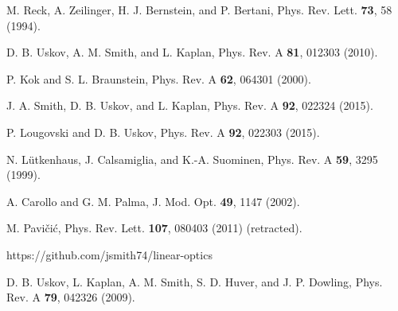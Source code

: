 \documentclass[aps,pra,twocolumn,superscriptaddress,floatfix,10pt]{revtex4}
\begin{document}
\begin{thebibliography}{99}
 M. Reck, A. Zeilinger, H. J. Bernstein, and P. Bertani, Phys. Rev. Lett. {\bf 73}, 58 (1994).

 D. B. Uskov, A. M. Smith, and L. Kaplan,
Phys. Rev. A {\bf 81}, 012303 (2010).

 P. Kok and S. L. Braunstein, Phys. Rev. A {\bf 62}, 064301 (2000).

 J. A. Smith, D. B. Uskov, and L. Kaplan, Phys. Rev. A {\bf 92}, 022324 (2015).

 P. Lougovski and D. B. Uskov, Phys. Rev. A {\bf 92}, 022303 (2015).

 N. L\"utkenhaus, J. Calsamiglia, and K.-A. Suominen, Phys. Rev. A {\bf 59}, 3295 (1999).

 A. Carollo and G. M. Palma, J. Mod. Opt. {\bf 49}, 1147 (2002).

 M. Pavi\v{c}i\'c, Phys. Rev. Lett. {\bf 107}, 080403 (2011) (retracted).

 https://github.com/jsmith74/linear-optics

 D. B. Uskov, L. Kaplan, A. M. Smith, S. D. Huver, and J. P. Dowling, Phys. Rev. A {\bf 79}, 042326 (2009).


\end{thebibliography}
\end{document}
